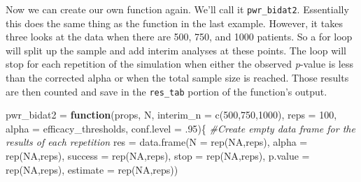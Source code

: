 \documentclass[
]{book}
\newenvironment{Shaded}{\begin{snugshade}}{\end{snugshade}}
\newcommand{\AttributeTok}[1]{\textcolor[rgb]{0.77,0.63,0.00}{#1}}
\newcommand{\CommentTok}[1]{\textcolor[rgb]{0.56,0.35,0.01}{\textit{#1}}}
\newcommand{\ConstantTok}[1]{\textcolor[rgb]{0.00,0.00,0.00}{#1}}
\newcommand{\ControlFlowTok}[1]{\textcolor[rgb]{0.13,0.29,0.53}{\textbf{#1}}}
\newcommand{\DecValTok}[1]{\textcolor[rgb]{0.00,0.00,0.81}{#1}}
\newcommand{\FunctionTok}[1]{\textcolor[rgb]{0.00,0.00,0.00}{#1}}
\newcommand{\NormalTok}[1]{#1}
\newcommand{\OtherTok}[1]{\textcolor[rgb]{0.56,0.35,0.01}{#1}}
\begin{document}
Now we can create our own function again. We'll call it \texttt{pwr\_bidat2}. Essentially this does the same thing as the function in the last example. However, it takes three looks at the data when there are 500, 750, and 1000 patients. So a for loop will split up the sample and add interim analyses at these points. The loop will stop for each repetition of the simulation when either the observed \emph{p}-value is less than the corrected alpha or when the total sample size is reached. Those results are then counted and save in the \texttt{res\_tab} portion of the function's output.

\begin{Shaded}
\begin{Highlighting}[]
\NormalTok{pwr\_bidat2 }\OtherTok{=} \ControlFlowTok{function}\NormalTok{(props, N,}
                      \AttributeTok{interim\_n =} \FunctionTok{c}\NormalTok{(}\DecValTok{500}\NormalTok{,}\DecValTok{750}\NormalTok{,}\DecValTok{1000}\NormalTok{),}
                      \AttributeTok{reps =} \DecValTok{100}\NormalTok{,}
                      \AttributeTok{alpha =}\NormalTok{ efficacy\_thresholds,}
                      \AttributeTok{conf.level =}\NormalTok{ .}\DecValTok{95}\NormalTok{)\{}
  \CommentTok{\#Create empty data frame for the results of each repetition }
\NormalTok{  res }\OtherTok{=} \FunctionTok{data.frame}\NormalTok{(}\AttributeTok{N =} \FunctionTok{rep}\NormalTok{(}\ConstantTok{NA}\NormalTok{,reps),}
                   \AttributeTok{alpha =} \FunctionTok{rep}\NormalTok{(}\ConstantTok{NA}\NormalTok{,reps),}
                   \AttributeTok{success =} \FunctionTok{rep}\NormalTok{(}\ConstantTok{NA}\NormalTok{,reps),}
                   \AttributeTok{stop =} \FunctionTok{rep}\NormalTok{(}\ConstantTok{NA}\NormalTok{,reps),}
                   \AttributeTok{p.value =} \FunctionTok{rep}\NormalTok{(}\ConstantTok{NA}\NormalTok{,reps),}
                   \AttributeTok{estimate =} \FunctionTok{rep}\NormalTok{(}\ConstantTok{NA}\NormalTok{,reps))}
  

\end{Highlighting}
\end{Shaded}
\end{document}
